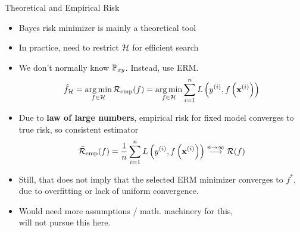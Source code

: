\documentclass[11pt,compress,t,notes=noshow, xcolor=table]{beamer}
\begin{document}
\begin{vbframe}{Theoretical and Empirical Risk}  
 

\begin{itemize}
\item Bayes risk minimizer is mainly a theoretical tool
\item In practice, need to restrict $\mathcal{H}$ for efficient search %
\item We don't normally know $\mathbb{P}_{xy}$. Instead, use ERM. 
$$
{\hat f}_{\mathcal{H}} = \mathop{\mathrm{arg\,min}}_{f \in \mathcal{H}} \mathcal{R}_{\text{emp}}(f) = \mathop{\mathrm{arg\,min}}_{f \in \mathcal{H}} \sum\limits_{i=1}^n L\left(y^{(i)}, f\left(\mathbf{x}^{(i)}\right)\right)
$$
\item Due to \textbf{law of large numbers}, empirical risk for fixed model converges to true risk, so consistent estimator
$$
\bar{\mathcal{R}}_{\text{emp}}(f) = \frac{1}{n} \sum\limits_{i=1}^n L\left(y^{(i)}, f\left(\mathbf{x}^{(i)}\right)\right) \overset{n \to \infty}{\longrightarrow} \mathcal{R}(f) 
$$
\item Still, that does not imply that the selected ERM minimizer converges to $f^{\ast}$, due to overfitting or lack of uniform convergence. 
\item Would need more assumptions / math. machinery for this, \\
will not pursue this here. 

\end{itemize}




\end{vbframe}
\end{document}
